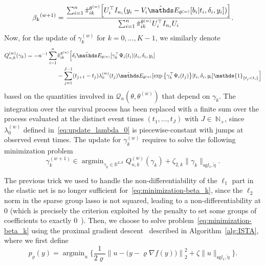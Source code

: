 \documentclass[11pt]{article}
\DeclareMathOperator{\argmin}{argmin}
\newcommand{\ind}[1]{\mathds{1}_{#1}}
\newcommand{\norm}[1]{\|#1\|}
\newcommand{\sA}{\mathscr A}
\newcommand{\cQ}{\mathcal Q}
\newcommand{\R}{\mathds R}
\newcommand{\N}{\mathds N}
\newcommand{\E}{\mathds E}
\begin{document}
\begin{equation}
  \label{eq:update_beta}
  {\beta_k}^{(w+1)}= \dfrac{\sum_{i=1}^n\hat \pi_{ik}^{\theta^{(w)}} \Big[U_i^\top I_{n_i} (y_i - V_i\hat \E_{\theta^{(w)}}[ b_i | t_i, \delta_i, y_i])\Big]}{\sum_{i=1}^n \hat \pi_{ik}^{\theta^{(w)}} U_i^\top I_{n_i} U_i}.
\end{equation}
Now, for the update of $\gamma_k^{(w)}$ for $k=0, \ldots, K-1$, we similarly denote
\begin{align*}
  Q^{(w)}_{n,k}(\gamma_k) = -n^{-1} \sum_{i=1}^n &\hat\pi_{ik}^{\theta^{(w)}} \Big[\delta_i \hat \E_{\theta^{(w)}}[ \gamma_k^\top \Psi_i(t_i) | t_i, \delta_i, y_i] \\
  & - \sum_{j=1}^{J-1} (t_{j+1}-t_j) \lambda_0^{(w)}(t_j) \hat \E_{\theta^{(w)}}[\exp \big\{\gamma_k^\top \Psi_i(t_j)\big\} | t_i, \delta_i, y_i] \ind{\{t_j < t_i\}} \Big]
\end{align*}
based on the quantities involved in $\cQ_n(\theta, \theta^{(w)})$ that depend on $\gamma_k$. The integration over the survival process has been replaced with a finite sum over the process evaluated at the distinct event times $(t_1, \ldots, t_J)$ with $J \in~\N_+$, since $\lambda_0^{(w)}$ defined in~\eqref{eq:update_lambda_0} is piecewise-constant with jumps at observed event times. The update for $\gamma_k^{(w)}$ requires to solve the following minimization problem
\begin{equation}
  \label{eq:minimization-gamma_k}
  \gamma_k^{(w+1)} \in \argmin_{\gamma_k \in \R^{L\sA}} Q^{(w)}_{n,k}(\gamma_k) + \zeta_{2,k} \norm{\gamma_k}_{\text{sg} l_1, \tilde{\eta}}.
\end{equation}

The previous trick we used to handle the non-differentiability of the $\ell_1$ part in the elastic net is no longer sufficient for~\eqref{eq:minimization-beta_k}, since the $\ell_2$ norm in the sparse group lasso is not squared, leading to a non-differentiability at 0 (which is precisely the criterion exploited by the penalty to set some groups of coefficients to exactly 0~\citep{simon2013sparse}). Then, we choose to solve problem~\eqref{eq:minimization-beta_k} using the proximal gradient descent~\citep{boyd2004convex} described in Algorithm~\ref{alg:ISTA}, where we first define
\[p_{\varrho}(y) = \argmin_u \Big\{\dfrac{1}{2\varrho} \left\lVert u - \big(y - \varrho  \nabla f(y) \big)\right\rVert_2^2 + \zeta \norm{u}_{\text{sg} l_1, \tilde{\eta}} \Big\}.\]

\vspace{.5cm}
\end{document}
